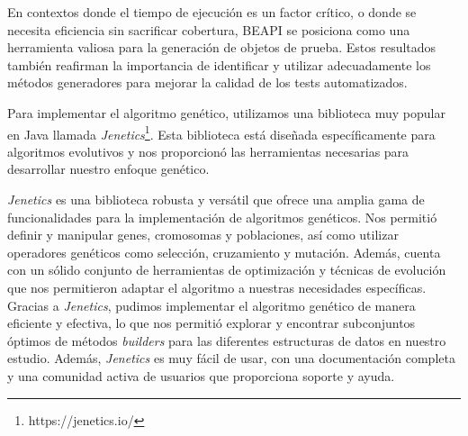 En contextos donde el tiempo de ejecución es un factor crítico, o donde se necesita eficiencia sin 
sacrificar cobertura, \textsf{BEAPI} se posiciona como una herramienta valiosa para la generación 
de objetos de prueba. Estos resultados también reafirman la importancia de identificar y utilizar 
adecuadamente los métodos generadores para mejorar la calidad de los tests automatizados.













Para implementar el algoritmo genético, utilizamos una biblioteca muy popular en Java llamada \emph{Jenetics}\footnote{https://jenetics.io/}. Esta biblioteca está diseñada específicamente para algoritmos evolutivos y nos proporcionó las herramientas necesarias para desarrollar nuestro enfoque genético.

\emph{Jenetics} es una biblioteca robusta y versátil que ofrece una amplia gama de funcionalidades para la implementación de algoritmos genéticos. Nos permitió definir y manipular genes, cromosomas y poblaciones, así como utilizar operadores genéticos como selección, cruzamiento y mutación. Además, cuenta con un sólido conjunto de herramientas de optimización y técnicas de evolución que nos permitieron adaptar el algoritmo a nuestras necesidades específicas.
Gracias a \emph{Jenetics}, pudimos implementar el algoritmo genético de manera eficiente y efectiva, lo que nos permitió explorar y encontrar subconjuntos óptimos de métodos \emph{builders} para las diferentes estructuras de datos en nuestro estudio. Además, \emph{Jenetics} es muy fácil de usar, con una documentación completa y una comunidad activa de usuarios que proporciona soporte y ayuda. 




